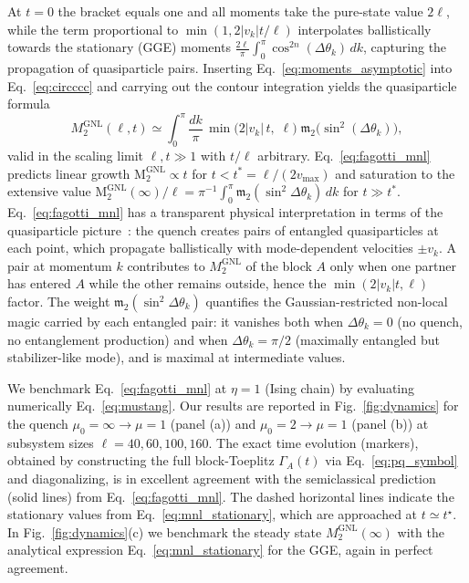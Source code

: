 \documentclass[prx,twocolumn,superscriptaddress,aps,10pt, frontmatterverbose, reprint,footinbib,longbibliography=true]{revtex4-2}
\newcommand{\NL}{\mathrm{GNL}}
\newcommand{\MNL}{\mathrm{M}_2^{\NL}}
\begin{document}
At $t=0$ the bracket equals one and all moments take the pure-state value $2\ell$, while the term proportional to $\min(1,2|v_k|t/\ell)$ interpolates ballistically towards  the stationary (GGE) moments $\frac{2\ell}{\pi}\int_0^\pi\cos^{2n}(\Delta\theta_k)\,dk$, capturing the propagation of quasiparticle pairs.
Inserting Eq.~\eqref{eq:moments_asymptotic} into  Eq.~\eqref{eq:circccc} and carrying out the contour integration yields the quasiparticle formula
\begin{equation}
    M_2^{\mathrm{GNL}}(\ell,t) \simeq \int_0^\pi\!\frac{dk}{\pi}\,\min\!\bigl(2|v_k|\,t,\;\ell\bigr)\;\mathfrak{m}_2\!\bigl(\sin^2(\Delta\theta_k)\bigr),
    \label{eq:fagotti_mnl}
\end{equation}
valid in the scaling limit $\ell, t \gg 1$ with $t/\ell$ arbitrary.
Eq.~\eqref{eq:fagotti_mnl} predicts linear growth $\MNL \propto t$ for $t < t^* = \ell/(2v_{\max})$ and saturation to the extensive value $\MNL(\infty)/\ell = \pi^{-1}\int_0^\pi \mathfrak{m}_2(\sin^2\!\Delta\theta_k)\, dk$ for $t \gg t^*$.
Eq.~\eqref{eq:fagotti_mnl} has a transparent physical interpretation in terms of the quasiparticle picture~\cite{Calabrese2005evolution,Fagotti2008}: the quench creates pairs of entangled quasiparticles at each point, which propagate ballistically with mode-dependent velocities $\pm v_k$.
A pair at momentum $k$ contributes to $M_2^{\mathrm{GNL}}$ of the block $A$ only when one partner has entered $A$ while the other remains outside, hence the $\min(2|v_k|t,\ell)$ factor.
The weight $\mathfrak{m}_2(\sin^2\Delta\theta_k)$  quantifies the Gaussian-restricted non-local magic carried by each entangled pair: it vanishes both when $\Delta\theta_k = 0$ (no quench, no entanglement production) and when $\Delta\theta_k = \pi/2$ (maximally entangled but stabilizer-like mode), and is maximal at intermediate values.

We benchmark Eq.~\eqref{eq:fagotti_mnl} at $\eta=1$ (Ising chain) by  evaluating numerically Eq.~\eqref{eq:mustang}. 
Our results are reported in Fig.~\ref{fig:dynamics} for the quench $\mu_0 = \infty \to \mu = 1$ (panel (a))  and $\mu_0 = 2 \to \mu = 1$ (panel (b)) at subsystem sizes $\ell = 40, 60, 100, 160$. 
The exact time evolution (markers), obtained by constructing the full block-Toeplitz $\Gamma_A(t)$ via Eq.~\eqref{eq:pq_symbol} and diagonalizing, is in excellent agreement with the semiclassical prediction (solid lines) from Eq.~\eqref{eq:fagotti_mnl}.
The dashed horizontal lines indicate the stationary values from Eq.~\eqref{eq:mnl_stationary}, which are approached at $t \simeq t^\star$.
In Fig.~\ref{fig:dynamics}(c) we benchmark the steady state $M_2^{\mathrm{GNL}}(\infty)$ with the analytical expression Eq.~\eqref{eq:mnl_stationary} for the GGE, again in perfect agreement. 
\end{document}
